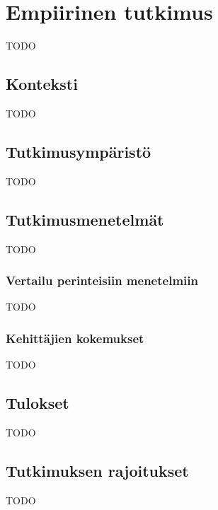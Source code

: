 \vspace{21.5pt}
\chapter{Empiirinen tutkimus}
TODO



\section{Konteksti}

TODO

\section{Tutkimusympäristö}

TODO

\section{Tutkimusmenetelmät}

TODO
\subsection{Vertailu perinteisiin menetelmiin}

TODO

\subsection{Kehittäjien kokemukset}

TODO

\section{Tulokset}

TODO

\section{Tutkimuksen rajoitukset}

TODO